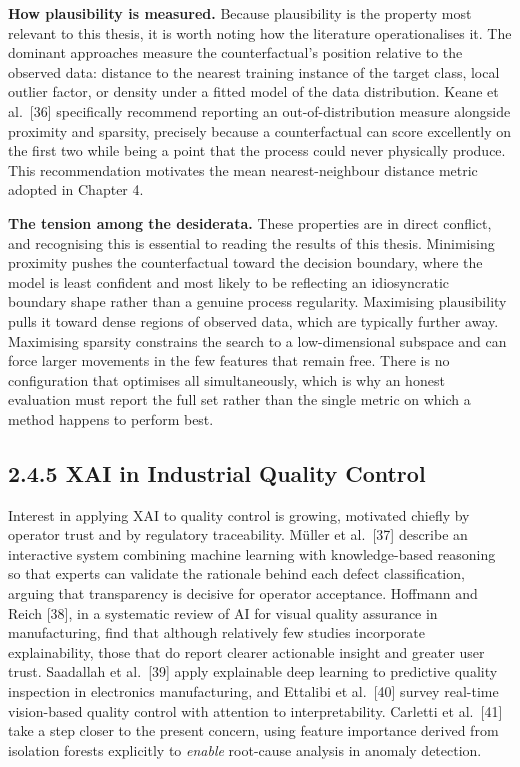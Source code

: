\textbf{How plausibility is measured.} Because plausibility is the property most relevant to this thesis, it is worth noting how the literature operationalises it. The dominant approaches measure the counterfactual's position relative to the observed data: distance to the nearest training instance of the target class, local outlier factor, or density under a fitted model of the data distribution. Keane et al.~{[}36{]} specifically recommend reporting an out-of-distribution measure alongside proximity and sparsity, precisely because a counterfactual can score excellently on the first two while being a point that the process could never physically produce. This recommendation motivates the mean nearest-neighbour distance metric adopted in Chapter 4.

\textbf{The tension among the desiderata.} These properties are in direct conflict, and recognising this is essential to reading the results of this thesis. Minimising proximity pushes the counterfactual toward the decision boundary, where the model is least confident and most likely to be reflecting an idiosyncratic boundary shape rather than a genuine process regularity. Maximising plausibility pulls it toward dense regions of observed data, which are typically further away. Maximising sparsity constrains the search to a low-dimensional subspace and can force larger movements in the few features that remain free. There is no configuration that optimises all simultaneously, which is why an honest evaluation must report the full set rather than the single metric on which a method happens to perform best.

\hypertarget{xai-in-industrial-quality-control}{%
\subsection{2.4.5 XAI in Industrial Quality Control}\label{xai-in-industrial-quality-control}}

Interest in applying XAI to quality control is growing, motivated chiefly by operator trust and by regulatory traceability. Müller et al.~{[}37{]} describe an interactive system combining machine learning with knowledge-based reasoning so that experts can validate the rationale behind each defect classification, arguing that transparency is decisive for operator acceptance. Hoffmann and Reich {[}38{]}, in a systematic review of AI for visual quality assurance in manufacturing, find that although relatively few studies incorporate explainability, those that do report clearer actionable insight and greater user trust. Saadallah et al.~{[}39{]} apply explainable deep learning to predictive quality inspection in electronics manufacturing, and Ettalibi et al.~{[}40{]} survey real-time vision-based quality control with attention to interpretability. Carletti et al.~{[}41{]} take a step closer to the present concern, using feature importance derived from isolation forests explicitly to \emph{enable} root-cause analysis in anomaly detection.

